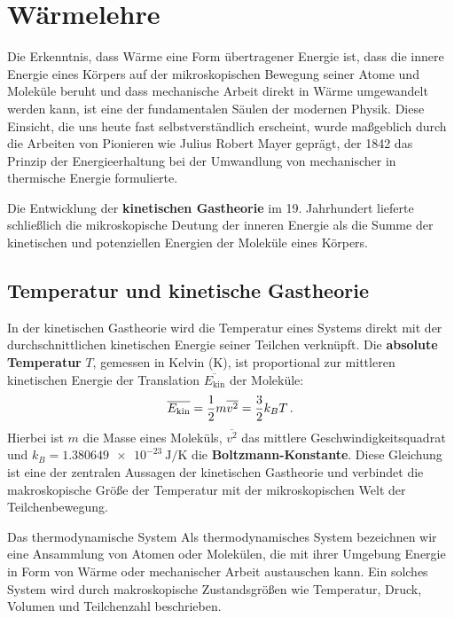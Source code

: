 \chapter{Wärmelehre}\label{chap: Waermelehre}
Die Erkenntnis, dass Wärme eine Form übertragener Energie ist, dass die innere Energie eines Körpers auf der mikroskopischen Bewegung seiner Atome und Moleküle beruht und dass mechanische Arbeit direkt in Wärme umgewandelt werden kann, ist eine der fundamentalen Säulen der modernen Physik. Diese Einsicht, die uns heute fast selbstverständlich erscheint, wurde maßgeblich durch die Arbeiten von Pionieren wie Julius Robert Mayer geprägt, der 1842 das Prinzip der Energieerhaltung bei der Umwandlung von mechanischer in thermische Energie formulierte.

Die Entwicklung der \textbf{kinetischen Gastheorie} im 19. Jahrhundert lieferte schließlich die mikroskopische Deutung der inneren Energie als die Summe der kinetischen und potenziellen Energien der Moleküle eines Körpers.

\section{Temperatur und kinetische Gastheorie}\label{sec: Temperatur_kinetische_Gastheorie}
In der kinetischen Gastheorie wird die Temperatur eines Systems direkt mit der durchschnittlichen kinetischen Energie seiner Teilchen verknüpft. Die \textbf{absolute Temperatur} $T$, gemessen in Kelvin (\si{\kelvin}), ist proportional zur mittleren kinetischen Energie der Translation $\overline{E_\mathrm{kin}}$ der Moleküle:
\begin{equation}\label{eq:def_temperatur_kinetisch}
    \overline{E_\mathrm{kin}} = \frac{1}{2}m\overline{v^2} = \frac{3}{2} k_B T \,.
\end{equation}
Hierbei ist $m$ die Masse eines Moleküls, $\overline{v^2}$ das mittlere Geschwindigkeitsquadrat und $k_B = \SI{1.380649e-23}{\joule\per\kelvin}$ die \textbf{Boltzmann-Konstante}. Diese Gleichung ist eine der zentralen Aussagen der kinetischen Gastheorie und verbindet die makroskopische Größe der Temperatur mit der mikroskopischen Welt der Teilchenbewegung.

\begin{rememberbox}{Das thermodynamische System}
    Als thermodynamisches System bezeichnen wir eine Ansammlung von Atomen oder Molekülen, die mit ihrer Umgebung Energie in Form von Wärme oder mechanischer Arbeit austauschen kann. Ein solches System wird durch makroskopische Zustandsgrößen wie Temperatur, Druck, Volumen und Teilchenzahl beschrieben.
\end{rememberbox}

